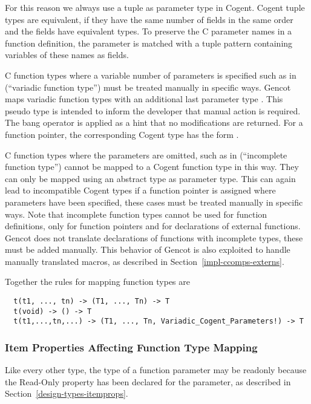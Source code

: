 For this reason we always use a tuple as parameter type in Cogent. Cogent tuple types are equivalent, if they
have the same number of fields in the same order and the fields have equivalent types. To preserve the C parameter names in 
a function definition, the parameter is matched with a tuple pattern containing variables of these
names as fields.

C function types where a variable number of
parameters is specified such as in  (``variadic function type'') must 
be treated manually in specific ways. Gencot maps variadic function types
with an additional last parameter type . This pseudo type is intended 
to inform the developer that manual action is required. The bang operator is applied as a hint
that no modifications are returned. For a function pointer, the corresponding Cogent type has
the form .

C function types where the parameters are omitted, such as in  (``incomplete function type'') 
cannot be mapped to a Cogent function type in this way. 
They can only be mapped using an abstract type as parameter type. This can again lead to incompatible 
Cogent types if a function pointer is assigned where parameters have been specified, these cases must 
be treated manually in specific ways. Note that incomplete function types cannot be used for function
definitions, only for function pointers and for declarations of external functions. 
Gencot does not translate declarations of functions with incomplete types, these must be added manually.
This behavior of Gencot is also exploited to handle manually translated macros, as described in 
Section~\ref{impl-ccomps-externs}.

Together the rules for mapping function types are
\begin{verbatim}
  t(t1, ..., tn) -> (T1, ..., Tn) -> T
  t(void) -> () -> T
  t(t1,...,tn,...) -> (T1, ..., Tn, Variadic_Cogent_Parameters!) -> T
\end{verbatim}

\subsubsection{Item Properties Affecting Function Type Mapping}

Like every other type, the type of a function parameter may be readonly because the Read-Only property
has been declared for the parameter, as described in Section~\ref{design-types-itemprops}.

